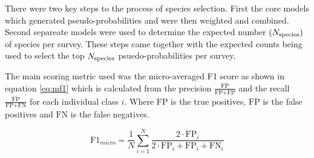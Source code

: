 There were two key steps to the process of species selection. First the core models which generated pseudo-probabilities and were then weighted and combined.
Second separeate models were used to determine the expected number $(N_{\text{species}})$ of species per survey.
These steps came together with the expected counts being used to select the top  $N_{\text{species}}$ psuedo-probabilities per survey.

%         
%         

\newcommand{\fp}{\text{FP}}
\newcommand{\fn}{\text{FN}}
\newcommand{\tp}{\text{FP}}

The main scoring metric used was the micro-averaged F1 score as shown in equation \ref{eq:mf1} which is calculated from the precision $\frac{\tp}{\tp + \fp}$ and the recall $\frac{\tp}{\tp + \fn}$ for each individual class $i$.
Where $\tp$ is the true positives, $\fp$ is the false positives and $\fn$ is the false negatives.

\begin{equation}\label{eq:mf1}
    \text{F1}_{micro} = \frac{1}{N}\sum_{i=1}^N\frac{2 \cdot \tp_i}{2 \cdot \tp_i + \fp_i + \fn_i}
\end{equation}
